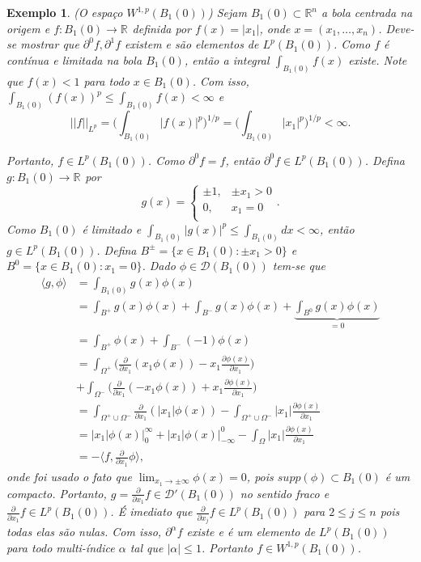 \documentclass[12pt]{book}
\newtheorem{exemplo}[teorema]{Exemplo}
\newcommand{\bigparenteses}[1]{\Big( #1 \Big) }
\newcommand{\derivadaparcial}[2]{\frac{\partial #1}{\partial #2}}
\newcommand{\distribuicoesgeral}[1]{\mathcal{D'}(#1)}
\newcommand{\espacoLp}[1]{L^{p}(#1)}
\newcommand{\espacosobolev}[1]{W^{1,p}(#1)}
\newcommand{\espacosobolevgeral}[2]{W^{1,#1}(#2)}
\newcommand{\funcaocond}[5]{
	#1 = 
	\left\{
	\begin{array}{cc}
		#2, & #3\\
		#4, & #5\\
	\end{array}
	\right.
}
\newcommand{\funcoestestegeral}[1]{\mathcal{D}(#1)}
\newcommand{\normaLp}[1]{||#1||_{L^{p}}}
\newcommand{\normaLpdefinicao}[2]{ \Big(\int_{#2}#1^{p}\Big)^{1/p}}
\newcommand{\produtointerno}[2]{\langle #1, #2 \rangle}
\newcommand{\real}[1]{\mathbb{R}^{#1}}
\newcommand{\reta}{\real{}}
\begin{document}
	\begin{exemplo}
		(O espaço $\espacosobolevgeral{p}{B_{1}(0)}$) Sejam $B_{1}(0)\subset \real{n}$ a bola centrada na origem e $f:B_{1}(0) \to \reta$ definida por $f(x) = |x_{1}|$, onde $x = (x_{1}, \dots, x_{n})$. Deve-se mostrar que $\partial^{0}f, \partial^{1}f $ existem e são elementos de $\espacoLp{B_{1}(0)}$. Como $f$ é contínua e limitada na bola $B_{1}(0)$, então a integral $\int_{B_{1}(0)}f(x)$ existe. Note que $f(x)<1$ para todo $x\in B_{1}(0)$. Com isso, $\int_{B_{1}(0)}(f(x))^{p}\leq \int_{B_{1}(0)}f(x)<\infty$ e 
		$$
		\normaLp{f}=\normaLpdefinicao{|f(x)|}{B_{1}(0)}=\normaLpdefinicao{|x_{1}|}{B_{1}(0)}<\infty.
		$$
		
		Portanto, $f \in \espacoLp{B_{1}(0)}$. Como $\partial^{0}f = f$, então $\partial^{0}f\in \espacoLp{B_{1}(0)}$. Defina $g:B_{1}(0)\to \reta$ por
		$$
		\funcaocond{g(x)}{\pm 1}{\pm x_{1}>0}{0}{x_{1} = 0}.
		$$
		Como $B_{1}(0)$ é limitado e $\int_{B_{1}(0)}|g(x)|^{p}\leq \int_{B_{1}(0)}dx<\infty$, então $g\in \espacoLp{B_{1}(0)}$. Defina $B^{\pm} = \{x \in B_{1}(0): \pm x_{1} >0\}$ e $B^{0}= \{x \in B_{1}(0):  x_{1} =0\}$. Dado $\phi \in \funcoestestegeral{B_{1}(0)}$ tem-se que
		$$
		\begin{aligned}
		\produtointerno{g}{\phi} 
		&= \int_{B_{1}(0)}g(x)\phi(x)
		\\
		&=\int_{B^{+}}g(x)\phi(x)+\int_{B^{-}}g(x)\phi(x)+\underbrace{\int_{B^{0}}g(x)\phi(x)}_{=0}
		\\
		&=\int_{B^{+}}\phi(x)+\int_{B^{-}}(-1)\phi(x)
		\\ &=\int_{\Omega^{+}}\bigparenteses{\derivadaparcial{}{x_{1}}(x_{1}\phi(x)) - x_{1}\derivadaparcial{\phi(x)}{x_{1}}} 
		\\
		&+\int_{\Omega^{-}}\bigparenteses{\derivadaparcial{}{x_{1}}(-x_{1}\phi(x)) + x_{1}\derivadaparcial{\phi(x)}{x_{1}}}
		\\ 
		&=
		\int_{\Omega^{+}\cup \Omega^{-}}\derivadaparcial{}{x_{1}}(|x_{1}|\phi(x)) - \int_{\Omega^{+}\cup \Omega^{-}}|x_{1}|\derivadaparcial{\phi(x)}{x_{1}}
		\\
		&=
		|x_{1}|\phi(x)\Big|_{0}^{\infty}+|x_{1}|\phi(x)\Big|_{-\infty}^{0}- \int_{\Omega}|x_{1}|\derivadaparcial{\phi(x)}{x_{1}}
		\\
		&=
		-\produtointerno{f}{\derivadaparcial{}{x_{1}}\phi},
		\end{aligned}
		$$
		onde foi usado o fato que $\lim_{x_{1}\to \pm \infty}\phi(x) = 0$, pois $supp(\phi) \subset B_{1}(0)$ é um compacto. Portanto, $g = \derivadaparcial{}{x_{1}}f \in \distribuicoesgeral{B_{1}(0)}$ no sentido fraco e $\derivadaparcial{}{x_{1}}f \in \espacoLp{B_{1}(0)}$. É imediato que $\derivadaparcial{}{x_{j}}f\in \espacoLp{B_{1}(0)}$ para $2\leq j \leq n$ pois todas elas são nulas. Com isso, $\partial^{\alpha}f$ existe e é um elemento de $\espacoLp{B_{1}(0)}$ para todo multi-índice $\alpha$ tal que $|\alpha|\leq 1$. Portanto $f\in \espacosobolev{B_{1}(0)}$.
	\end{exemplo}
	
\end{document}
